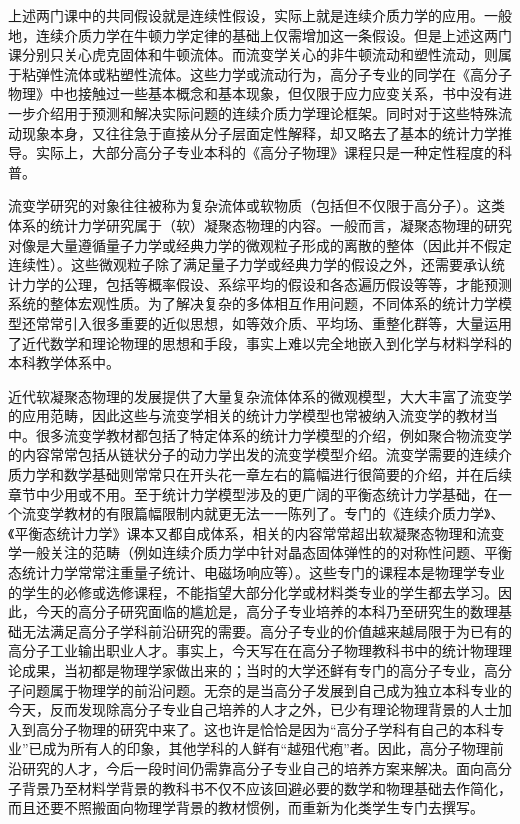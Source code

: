 \documentclass[main.tex]{subfiles}
\begin{document}
上述两门课中的共同假设就是连续性假设，实际上就是连续介质力学的应用。一般地，连续介质力学在牛顿力学定律的基础上仅需增加这一条假设。但是上述这两门课分别只关心虎克固体和牛顿流体。而流变学关心的非牛顿流动和塑性流动，则属于粘弹性流体或粘塑性流体。这些力学或流动行为，高分子专业的同学在《高分子物理》中也接触过一些基本概念和基本现象，但仅限于应力应变关系，书中没有进一步介绍用于预测和解决实际问题的连续介质力学理论框架。同时对于这些特殊流动现象本身，又往往急于直接从分子层面定性解释，却又略去了基本的统计力学推导。实际上，大部分高分子专业本科的《高分子物理》课程只是一种定性程度的科普。

流变学研究的对象往往被称为复杂流体或软物质（包括但不仅限于高分子）。这类体系的统计力学研究属于（软）凝聚态物理的内容。一般而言，凝聚态物理的研究对像是大量遵循量子力学或经典力学的微观粒子形成的离散的整体（因此并不假定连续性）。这些微观粒子除了满足量子力学或经典力学的假设之外，还需要承认统计力学的公理，包括等概率假设、系综平均的假设和各态遍历假设等等，才能预测系统的整体宏观性质。为了解决复杂的多体相互作用问题，不同体系的统计力学模型还常常引入很多重要的近似思想，如等效介质、平均场、重整化群等，大量运用了近代数学和理论物理的思想和手段，事实上难以完全地嵌入到化学与材料学科的本科教学体系中。

近代软凝聚态物理的发展提供了大量复杂流体体系的微观模型，大大丰富了流变学的应用范畴，因此这些与流变学相关的统计力学模型也常被纳入流变学的教材当中。很多流变学教材都包括了特定体系的统计力学模型的介绍，例如聚合物流变学的内容常常包括从链状分子的动力学出发的流变学模型介绍。流变学需要的连续介质力学和数学基础则常常只在开头花一章左右的篇幅进行很简要的介绍，并在后续章节中少用或不用。至于统计力学模型涉及的更广阔的平衡态统计力学基础，在一个流变学教材的有限篇幅限制内就更无法一一陈列了。专门的《连续介质力学》、《平衡态统计力学》课本又都自成体系，相关的内容常常超出软凝聚态物理和流变学一般关注的范畴（例如连续介质力学中针对晶态固体弹性的的对称性问题、平衡态统计力学常常注重量子统计、电磁场响应等）。这些专门的课程本是物理学专业的学生的必修或选修课程，不能指望大部分化学或材料类专业的学生都去学习。因此，今天的高分子研究面临的尴尬是，高分子专业培养的本科乃至研究生的数理基础无法满足高分子学科前沿研究的需要。高分子专业的价值越来越局限于为已有的高分子工业输出职业人才。事实上，今天写在在高分子物理教科书中的统计物理理论成果，当初都是物理学家做出来的；当时的大学还鲜有专门的高分子专业，高分子问题属于物理学的前沿问题。无奈的是当高分子发展到自己成为独立本科专业的今天，反而发现除高分子专业自己培养的人才之外，已少有理论物理背景的人士加入到高分子物理的研究中来了。这也许是恰恰是因为“高分子学科有自己的本科专业”已成为所有人的印象，其他学科的人鲜有“越殂代疱”者。因此，高分子物理前沿研究的人才，今后一段时间仍需靠高分子专业自己的培养方案来解决。面向高分子背景乃至材料学背景的教科书不仅不应该回避必要的数学和物理基础去作简化，而且还要不照搬面向物理学背景的教材惯例，而重新为化类学生专门去撰写。
\end{document}
